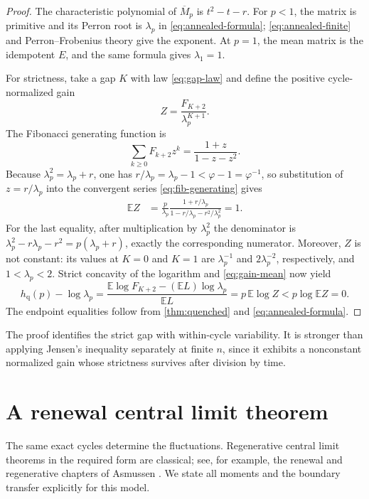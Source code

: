 \documentclass[11pt,a4paper]{amsart}
\theoremstyle{definition}
\theoremstyle{remark}
\newcommand{\Exp}{\mathbb E}
\newcommand{\hq}{h_{\mathrm q}}
\begin{document}
\begin{proof}
The characteristic polynomial of $\overline M_p$ is
$t^2-t-r$.  For $p<1$, the matrix is primitive and its Perron root is
$\lambda_p$ in \eqref{eq:annealed-formula}; \eqref{eq:annealed-finite} and
Perron--Frobenius theory give the exponent.  At $p=1$, the mean matrix is the
idempotent $E$, and the same formula gives $\lambda_1=1$.

For strictness, take a gap $K$ with law \eqref{eq:gap-law} and define the
positive cycle-normalized gain
\begin{equation}\label{eq:normalized-gain}
 Z=\frac{F_{K+2}}{\lambda_p^{K+1}}.
\end{equation}
The Fibonacci generating function is
\begin{equation}\label{eq:fib-generating}
 \sum_{k\geq0}F_{k+2}z^k=\frac{1+z}{1-z-z^2}.
\end{equation}
Because $\lambda_p^2=\lambda_p+r$, one has
$r/\lambda_p=\lambda_p-1<\varphi-1=\varphi^{-1}$, so substitution of
$z=r/\lambda_p$ into the convergent series \eqref{eq:fib-generating} gives
\begin{align}
 \Exp Z
 &=\frac p{\lambda_p}
   \frac{1+r/\lambda_p}{1-r/\lambda_p-r^2/\lambda_p^2}=1.\label{eq:gain-mean}
\end{align}
For the last equality, after multiplication by $\lambda_p^2$ the
denominator is
$\lambda_p^2-r\lambda_p-r^2=p(\lambda_p+r)$, exactly the corresponding
numerator.  Moreover, $Z$ is not constant: its values at $K=0$ and $K=1$
are $\lambda_p^{-1}$ and $2\lambda_p^{-2}$, respectively, and
$1<\lambda_p<2$.  Strict concavity of the logarithm and
\eqref{eq:gain-mean} now yield
\[
 \hq(p)-\log\lambda_p
 =\frac{\Exp\log F_{K+2}-(\Exp L)\log\lambda_p}{\Exp L}
 =p\,\Exp\log Z
 <p\log\Exp Z=0.
\]
The endpoint equalities follow from \cref{thm:quenched} and
\eqref{eq:annealed-formula}.
\end{proof}

The proof identifies the strict gap with within-cycle variability.  It is
stronger than applying Jensen's inequality separately at finite $n$, since
it exhibits a nonconstant normalized gain whose strictness survives after
division by time.

\section{A renewal central limit theorem}
\label{sec:clt}

The same exact cycles determine the fluctuations.  Regenerative central
limit theorems in the required form are classical; see, for example, the
renewal and regenerative chapters of Asmussen \cite{Asmussen2003}.  We state
all moments and the boundary transfer explicitly for this model.
\end{document}
